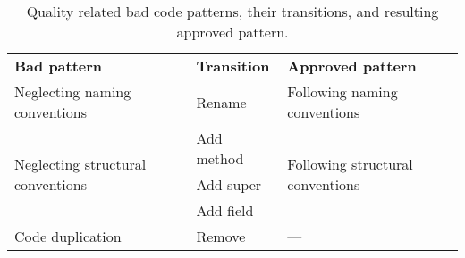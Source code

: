 \begin{sidewaystable}
\centering
\caption[Quality related bad code patterns]{Quality related bad code patterns, their transitions, and resulting approved pattern.}
\begin{tabular}{|l|l|l|}
\multicolumn{1}{l}{\textbf{Bad pattern}}&
\multicolumn{1}{l}{\textbf{Transition}}&
\multicolumn{1}{l}{\textbf{Approved pattern}}\\
\cline{1-3}

Neglecting naming conventions & 
Rename & 
Following naming conventions \\
\cline{1-3}

\multirow{3}{*}{Neglecting structural conventions} &
Add method &
\multirow{3}{*}{Following structural conventions} \\
\cline{2-2}

&
Add super &
\\
\cline{2-2}

&
Add field &
\\
\cline{1-3}

Code duplication & 
Remove & 
--- \\
\cline{1-3}
 

\end{tabular}
\end{sidewaystable}